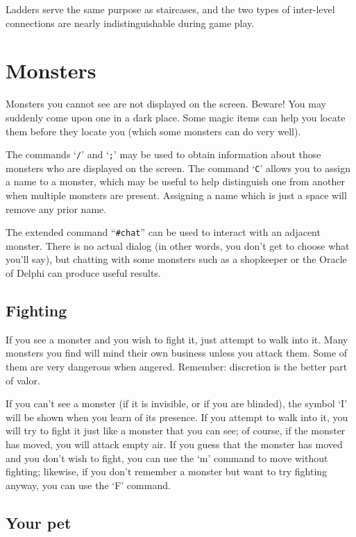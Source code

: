 Ladders serve the same purpose as staircases, and the two types of
inter-level connections are nearly indistinguishable during game play.

\section{Monsters}

Monsters you cannot see are not displayed on the screen.  Beware!
You may suddenly come upon one in a dark place.  Some magic items can
help you locate them before they locate you (which some monsters can do
very well).

The commands `{\tt /}' and `{\tt ;}' may be used to obtain information
about those
monsters who are displayed on the screen.  The command `{\tt C}' allows you
to assign a name to a monster, which may be useful to help distinguish
one from another when multiple monsters are present.  Assigning a name
which is just a space will remove any prior name.

The extended command ``{\tt \#chat}'' can be used to interact with an adjacent
monster.  There is no actual dialog (in other words, you don't get to
choose what you'll say), but chatting with some monsters such as a
shopkeeper or the Oracle of Delphi can produce useful results.

\subsection*{Fighting}

If you see a monster and you wish to fight it, just attempt to walk
into it.  Many monsters you find will mind their own business unless
you attack them.  Some of them are very dangerous when angered.
Remember:  discretion is the better part of valor.

If you can't see a monster (if it is invisible, or if you are blinded),
the symbol `I' will be shown when you learn of its presence.
If you attempt to walk into it, you will try to fight it just like
a monster that you can see; of course,
if the monster has moved, you will attack empty air.  If you guess
that the monster has moved and you don't wish to fight, you can use the `m'
command to move without fighting; likewise, if you don't remember a monster
but want to try fighting anyway, you can use the `F' command.

\subsection*{Your pet}

